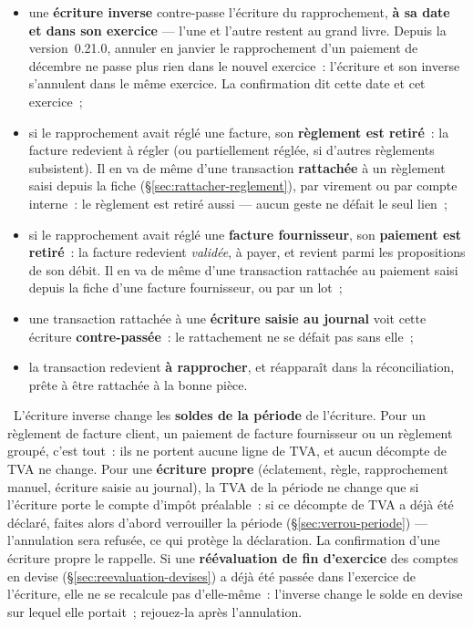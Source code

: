 \documentclass[a4paper,11pt,oneside]{article}
\begin{document}
\begin{itemize}
    \item une \textbf{écriture inverse} contre-passe l'écriture du rapprochement, \textbf{à sa
          date et dans son exercice} --- l'une et l'autre restent au grand livre. Depuis la
          version~0.21.0, annuler en janvier le rapprochement d'un paiement de décembre ne passe
          plus rien dans le nouvel exercice~: l'écriture et son inverse s'annulent dans le même
          exercice. La confirmation dit cette date et cet exercice~;
    \item si le rapprochement avait réglé une facture, son \textbf{règlement est retiré}~: la
          facture redevient à régler (ou partiellement réglée, si d'autres règlements
          subsistent). Il en va de même d'une transaction \textbf{rattachée} à un règlement
          saisi depuis la fiche (\S\ref{sec:rattacher-reglement}), par virement ou par compte
          interne~: le règlement est retiré aussi --- aucun geste ne défait le seul lien~;
    \item si le rapprochement avait réglé une \textbf{facture fournisseur}, son
          \textbf{paiement est retiré}~: la facture redevient \emph{validée}, à payer, et
          revient parmi les propositions de son débit. Il en va de même d'une transaction
          rattachée au paiement saisi depuis la fiche d'une facture fournisseur, ou par un lot~;
    \item une transaction rattachée à une \textbf{écriture saisie au journal} voit cette
          écriture \textbf{contre-passée}~: le rattachement ne se défait pas sans elle~;
    \item la transaction redevient \textbf{à rapprocher}, et réapparaît dans la réconciliation,
          prête à être rattachée à la bonne pièce.
\end{itemize}

\keshAttention\ L'écriture inverse change les \textbf{soldes de la période} de l'écriture. Pour un
règlement de facture client, un paiement de facture fournisseur ou un règlement groupé, c'est
tout~: ils ne portent aucune ligne de TVA, et aucun décompte de TVA ne change. Pour une
\textbf{écriture propre} (éclatement, règle, rapprochement manuel, écriture saisie au journal),
la TVA de la période ne change que si l'écriture porte le compte d'impôt préalable~: si ce
décompte de TVA a déjà été déclaré, faites alors d'abord verrouiller la période
(\S\ref{sec:verrou-periode}) --- l'annulation sera refusée, ce qui protège la déclaration. La
confirmation d'une écriture propre le rappelle. Si une \textbf{réévaluation de fin d'exercice} des comptes en devise
(\S\ref{sec:reevaluation-devises}) a déjà été passée dans l'exercice de l'écriture, elle ne se recalcule
pas d'elle-même~: l'inverse change le solde en devise sur lequel elle portait~; rejouez-la après
l'annulation.
\end{document}
